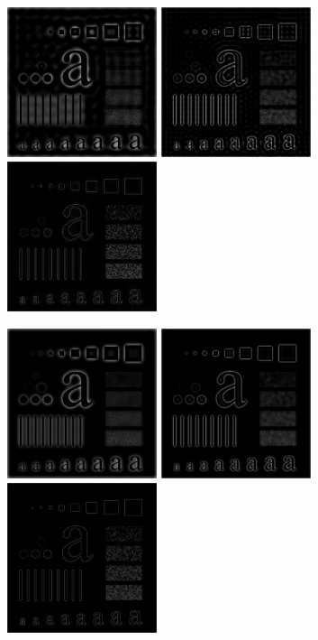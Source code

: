 \documentclass{article}
\begin{document}
\includegraphics[width=0.33\textwidth]{../data/ideal_highpass_30_characters_test_pattern.jpg}
\includegraphics[width=0.33\textwidth]{../data/ideal_highpass_60_characters_test_pattern.jpg}
\includegraphics[width=0.33\textwidth]{../data/ideal_highpass_160_characters_test_pattern.jpg}

\includegraphics[width=0.33\textwidth]{../data/butterworth_highpass_30_characters_test_pattern.jpg}
\includegraphics[width=0.33\textwidth]{../data/butterworth_highpass_60_characters_test_pattern.jpg}
\includegraphics[width=0.33\textwidth]{../data/butterworth_highpass_160_characters_test_pattern.jpg}
\end{document}
